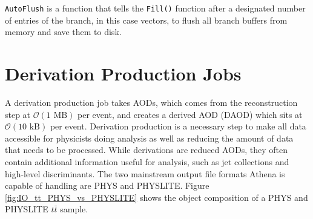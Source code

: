 \verb|AutoFlush| is a function that tells the \verb|Fill()| function after a designated number of entries of the branch, in this case vectors, to flush all branch buffers from memory and save them to disk. 


\section{Derivation Production Jobs}
 \label{section: ATLASIO_Derivation}

A derivation production job takes AODs, which comes from the reconstruction step at $\mathcal{O}(1 \text{ MB})$ per event, and creates a derived AOD (DAOD) which sits at $\mathcal{O}(10 \text{ kB})$ per event.
Derivation production is a necessary step to make all data accessible for physicists doing analysis as well as reducing the amount of data that needs to be processed.
While derivations are reduced AODs, they often contain additional information useful for analysis, such as jet collections and high-level discriminants.\cite{PHYSLITE_A_new_2024}
The two mainstream output file formats Athena is capable of handling are PHYS and PHYSLITE.  
Figure \ref{fig:IO_tt_PHYS_vs_PHYSLITE} shows the object composition of a PHYS and PHYSLITE $t\bar{t}$ sample. 
